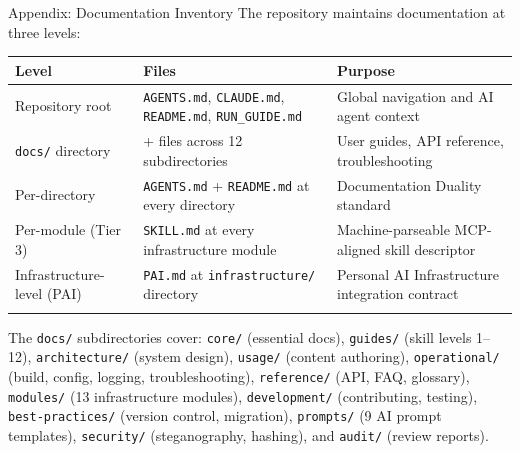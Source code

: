 \documentclass[
  ignorenonframetext,
]{beamer}
\author{\texorpdfstring{}{}}
\date{}
\newcounter{none} %
\begin{document}
\begin{frame}
\newpage
\end{frame}

\begin{frame}[fragile]{Appendix: Documentation Inventory}
\protect{}\label{appendix-docs}
The repository maintains documentation at three levels:

\begin{table}[h]
\caption{Documentation inventory across the four-layer documentation architecture, from repository-wide system files to per-module skill descriptors.}
\label{tab:documentation-inventory}
\end{table}

{\def\LTcaptype{none} %
\begin{longtable}[]{@{}
  >{\raggedright\arraybackslash}p{}
  >{\centering\arraybackslash}p{}
  >{\raggedright\arraybackslash}p{}@{}}
\toprule\noalign{}
\begin{minipage}[b]{\linewidth}\raggedright
Level
\end{minipage} & \begin{minipage}[b]{\linewidth}\centering
Files
\end{minipage} & \begin{minipage}[b]{\linewidth}\raggedright
Purpose
\end{minipage} \\
\midrule\noalign{}
\endhead
Repository root & \texttt{AGENTS.md}, \texttt{CLAUDE.md},
\texttt{README.md}, \texttt{RUN\_GUIDE.md} & Global navigation and AI
agent context \\
\texttt{docs/} directory & 90+ files across 12 subdirectories & User
guides, API reference, troubleshooting \\
Per-directory & \texttt{AGENTS.md} + \texttt{README.md} at every
directory & Documentation Duality standard \\
Per-module (Tier 3) & \texttt{SKILL.md} at every infrastructure module &
Machine-parseable MCP-aligned skill descriptor \\
Infrastructure-level (PAI) & \texttt{PAI.md} at \texttt{infrastructure/}
directory & Personal AI Infrastructure integration contract \\
\bottomrule\noalign{}
\end{longtable}
}

The \texttt{docs/} subdirectories cover: \texttt{core/} (essential
docs), \texttt{guides/} (skill levels 1--12), \texttt{architecture/}
(system design), \texttt{usage/} (content authoring),
\texttt{operational/} (build, config, logging, troubleshooting),
\texttt{reference/} (API, FAQ, glossary), \texttt{modules/} (13
infrastructure modules), \texttt{development/} (contributing, testing),
\texttt{best-practices/} (version control, migration), \texttt{prompts/}
(9 AI prompt templates), \texttt{security/} (steganography, hashing),
and \texttt{audit/} (review reports).
\end{frame}
\end{document}
